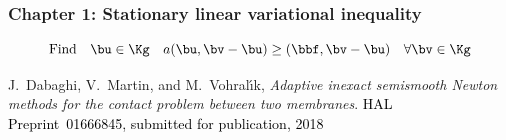 \begin{frame}
\frametitle{Chapter 1: Stationary linear variational inequality}
\vspace{-0.2 cm}
\begin{equation*}
\vspace{-0.2 cm}
\mbox{Find} \quad \bu \in \Kg \quad a(\bu,\bv-\bu) \geq (\bbf,\bv-\bu) \quad \forall \bv \in \Kg
\end{equation*}


\vspace{-0.4 cm}
\begin{figure}
\end{figure}
\begin{thebibliography}{10}

 \scriptsize{
 {\sc J.~Dabaghi, V.~Martin, and M.~Vohral{\'{\i}}k}, {\em Adaptive inexact
  semismooth Newton methods for the contact problem between two membranes}.
 \textcolor{black}{HAL Preprint~01666845, submitted for publication, 2018}
 }

\end{thebibliography}
\end{frame}
%
